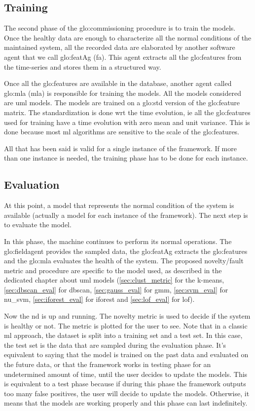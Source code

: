 \subsection{Training}
The second phase of the \gls{glo:commissioning} procedure is to train the models. Once the healthy data are enough to characterize all the normal conditions of the maintained system, all the recorded data are elaborated by another software agent that we call \gls{glo:featAg} (\gls{fa}). This agent extracts all the \gls{glo:feature}s from the time-series and stores them in a structured way.

Once all the \gls{glo:feature}s are available in the database, another agent called \gls{glo:mla} (\gls{mla}) is responsible for training the models. All the models considered are \gls{uml} models. The models are trained on a \gls{glo:std} version of the \gls{glo:feature} matrix. The standardization is done \gls{wrt} the time evolution, \gls{ie} all the \gls{glo:feature}s used for training have a time evolution with zero mean and unit variance. This is done because most \gls{ml} algorithms are sensitive to the scale of the \gls{glo:feature}s.

All that has been said is valid for a single instance of the framework. If more than one instance is needed, the training phase has to be done for each instance.

\subsection{Evaluation}
At this point, a model that represents the normal condition of the system is available (actually a model for each instance of the framework). The next step is to evaluate the model.

In this phase, the machine continues to perform its normal operations. The \gls{glo:fieldagent} provides the sampled data, the \gls{glo:featAg} extracts the \gls{glo:feature}s and the \gls{glo:mla} evaluates the health of the system.
The proposed novelty/fault metric and procedure are specific to the model used, as described in the dedicated chapter about \gls{uml} models (\autoref{sec:clust_metric} for the k-means, \autoref{sec:dbscan_eval} for \gls{dbscan}, \autoref{sec:gauss_eval} for \gls{gmm}, \autoref{sec:svm_eval} for \gls{nu_svm}, \autoref{sec:iforest_eval} for \gls{iforest} and \autoref{sec:lof_eval} for \gls{lof}). 

Now the \gls{nd} is up and running. The novelty metric is used to decide if the system is healthy or not. The metric is plotted for the user to see.
Note that in a classic \gls{ml} approach, the dataset is split into a training set and a test set. In this case, the test set is the data that are sampled during the evaluation phase. It's equivalent to saying that the model is trained on the past data and evaluated on the future data, or that the framework works in testing phase for an undetermined amount of time, until the user decides to update the models. This is equivalent to a test phase because if during this phase the framework outputs too many false positives, the user will decide to update the models. Otherwise, it means that the models are working properly and this phase can last indefinitely.

